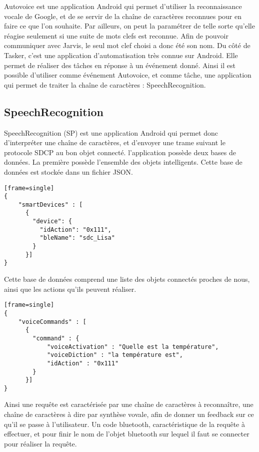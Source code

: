 Autovoice est une application Android qui permet d'utiliser la reconnaissance vocale de Google, et de se 
servir de la chaîne de caractères reconnues pour en faire ce que l'on souhaite. Par ailleurs, on peut la 
paramétrer de telle sorte qu'elle réagise seulement si une suite de mots clefs est reconnue. Afin de pouvoir 
communiquer avec Jarvis, le seul mot clef choisi a donc été son nom. Du côté de Tasker, c'est une application 
d'automatisation très connue sur Android. Elle permet de réaliser des tâches en réponse à un événement donné. 
Ainsi il est possible d'utiliser comme événement Autovoice, et comme tâche, une application qui permet de 
traiter la chaîne de caractères : SpeechRecognition.

	\subsection{SpeechRecognition}
	
SpeechRecognition (SP) est une application Android qui permet donc d'interpréter une chaîne de caractères, et 
d'envoyer une trame suivant le protocole SDCP au bon objet connecté. l'application possède deux bases de 
données. La première possède l'ensemble des objets intelligents. Cette base de données est stockée dans un 
fichier JSON.

\begin{lstlisting}[caption=Base de données des objets intelligents][frame=single]
{
    "smartDevices" : [
      {
        "device": {
          "idAction": "0x111",
          "bleName": "sdc_Lisa"
        }
      }]
}
\end{lstlisting}

Cette base de données comprend une liste des objets connectés proches de nous, ainsi que les actions qu'ils 
peuvent réaliser. 

\begin{lstlisting}[caption=Base de données des commandes vocales][frame=single]
{
    "voiceCommands" : [
      {
        "command" : {
            "voiceActivation" : "Quelle est la température",
            "voiceDiction" : "la température est",
            "idAction" : "0x111"
        }
      }]
}
\end{lstlisting}

Ainsi une requête est caractérisée par une chaîne de caractères à reconnaître, une chaîne de caractères à dire par synthèse vovale, afin de donner un feedback sur ce qu'il se passe à l'utilisateur. Un code bluetooth, caractéristique de la requête à effectuer, et pour finir le nom de l'objet bluetooth sur lequel il faut se connecter pour réaliser la requête.

